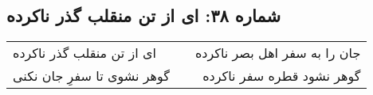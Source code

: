\begin{center}
\section*{شماره ۳۸: ای از تن منقلب گذر ناکرده}
\label{sec:038}
\begin{longtable}{l p{0.5cm} r}
ای از تن منقلب گذر ناکرده
&&
جان را به سفر اهل بصر ناکرده
\\
گوهر نشوی تا سفرِ جان نکنی
&&
گوهر نشود قطره سفر ناکرده
\\
\end{longtable}
\end{center}
